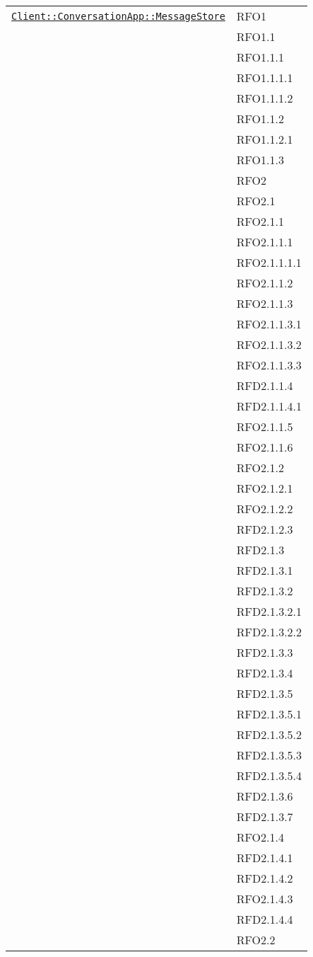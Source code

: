\begin{longtable}{|>{\centering}m{10cm}|m{3cm}<{\centering}|}
\hyperref[Client::ConversationApp::MessageStore]{\texttt{Client::ConversationApp::MessageStore}} & RFO1\\
& RFO1.1\\
& RFO1.1.1\\
& RFO1.1.1.1\\
& RFO1.1.1.2\\
& RFO1.1.2\\
& RFO1.1.2.1\\
& RFO1.1.3\\
& RFO2\\
& RFO2.1\\
& RFO2.1.1\\
& RFO2.1.1.1\\
& RFO2.1.1.1.1\\
& RFO2.1.1.2\\
& RFO2.1.1.3\\
& RFO2.1.1.3.1\\
& RFO2.1.1.3.2\\
& RFO2.1.1.3.3\\
& RFD2.1.1.4\\
& RFD2.1.1.4.1\\
& RFO2.1.1.5\\
& RFO2.1.1.6\\
& RFO2.1.2\\
& RFO2.1.2.1\\
& RFO2.1.2.2\\
& RFD2.1.2.3\\
& RFD2.1.3\\
& RFD2.1.3.1\\
& RFD2.1.3.2\\
& RFD2.1.3.2.1\\
& RFD2.1.3.2.2\\
& RFD2.1.3.3\\
& RFD2.1.3.4\\
& RFD2.1.3.5\\
& RFD2.1.3.5.1\\
& RFD2.1.3.5.2\\
& RFD2.1.3.5.3\\
& RFD2.1.3.5.4\\
& RFD2.1.3.6\\
& RFD2.1.3.7\\
& RFO2.1.4\\
& RFD2.1.4.1\\
& RFD2.1.4.2\\
& RFO2.1.4.3\\
& RFD2.1.4.4\\
& RFO2.2\\

\end{longtable}
